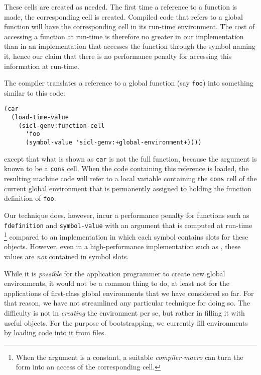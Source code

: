 These cells are created as needed.  The first time a reference to a
function is made, the corresponding cell is created.  Compiled code
that refers to a global function will have the corresponding cell in
its run-time environment.  The cost of accessing a function at
run-time is therefore no greater in our implementation than in an
implementation that accesses the function through the symbol naming
it, hence our claim that there is no performance penalty for accessing
this information at run-time.

The \sicl{} compiler translates a reference to a global function (say
\texttt{foo}) into something similar to this code:

{\small\begin{verbatim}
(car
  (load-time-value
    (sicl-genv:function-cell
      'foo
      (symbol-value 'sicl-genv:+global-environment+))))
\end{verbatim}}

except that what is shown as \texttt{car} is not the full
\commonlisp{} function, because the argument is known to be a
\texttt{cons} cell.  When the code containing this reference is
loaded, the resulting machine code will refer to a local variable
containing the \texttt{cons} cell of the current global environment
that is permanently assigned to holding the function definition of
\texttt{foo}.

Our technique does, however, incur a performance penalty for functions
such as \texttt{fdefinition} and \texttt{symbol-value} with an
argument that is computed at run-time%
\footnote{When the argument is a constant, a suitable
  \emph{compiler-macro} can turn the form into an access of the
  corresponding cell.}
compared to an implementation in which each symbol contains slots for
these objects.  However, even in a high-performance implementation such
as \sbcl{}, these values are \emph{not} contained in symbol slots.

While it is \emph{possible} for the application programmer to create
new global environments, it would not be a common thing to do, at
least not for the applications of first-class global environments that
we have considered so far.  For that reason, we have not streamlined
any particular technique for doing so.  The difficulty is not in
\emph{creating} the environment per se, but rather in filling it with
useful objects.  For the purpose of bootstrapping, we currently fill
environments by loading code into it from files.
